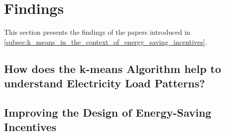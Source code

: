 \chapter{Findings}
\label{cha:findings}


This section presents the findings of the papers introduced in \autoref{subsec:k_means_in_the_context_of_energy_saving_incentives}.

\section{How does the k-means Algorithm help to understand Electricity Load Patterns?}
\label{sec:findings_understand_electricity_load_patterns}


\section{Improving the Design of Energy-Saving Incentives}
\label{sec:improving_the_design_of_energy_saving_incentives}


